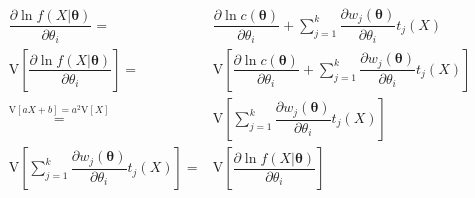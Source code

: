 \documentclass[
]{book}
\theoremstyle{definition}
\theoremstyle{definition}
\theoremstyle{definition}
\theoremstyle{definition}
\theoremstyle{remark}
\begin{document}
\[
\begin{aligned}
\dfrac{\partial\ln f\left(X|\boldsymbol{\theta}\right)}{\partial\theta_{{\scriptscriptstyle i}}}= & \dfrac{\partial\ln c\left(\boldsymbol{\theta}\right)}{\partial\theta_{{\scriptscriptstyle i}}}+\sum\limits _{j=1}^{k}\dfrac{\partial w_{{\scriptscriptstyle j}}\left(\boldsymbol{\theta}\right)}{\partial\theta_{{\scriptscriptstyle i}}}t_{{\scriptscriptstyle j}}\left(X\right)\\
\mathrm{V}\left[\dfrac{\partial\ln f\left(X|\boldsymbol{\theta}\right)}{\partial\theta_{{\scriptscriptstyle i}}}\right]= & \mathrm{V}\left[\dfrac{\partial\ln c\left(\boldsymbol{\theta}\right)}{\partial\theta_{{\scriptscriptstyle i}}}+\sum\limits _{j=1}^{k}\dfrac{\partial w_{{\scriptscriptstyle j}}\left(\boldsymbol{\theta}\right)}{\partial\theta_{{\scriptscriptstyle i}}}t_{{\scriptscriptstyle j}}\left(X\right)\right]\\
\overset{\mathrm{V}\left[aX+b\right]=a^{2}\mathrm{V}\left[X\right]}{=} & \mathrm{V}\left[\sum\limits _{j=1}^{k}\dfrac{\partial w_{{\scriptscriptstyle j}}\left(\boldsymbol{\theta}\right)}{\partial\theta_{{\scriptscriptstyle i}}}t_{{\scriptscriptstyle j}}\left(X\right)\right]\\
\mathrm{V}\left[\sum\limits _{j=1}^{k}\dfrac{\partial w_{{\scriptscriptstyle j}}\left(\boldsymbol{\theta}\right)}{\partial\theta_{{\scriptscriptstyle i}}}t_{{\scriptscriptstyle j}}\left(X\right)\right]= & \mathrm{V}\left[\dfrac{\partial\ln f\left(X|\boldsymbol{\theta}\right)}{\partial\theta_{{\scriptscriptstyle i}}}\right]
\end{aligned}
\]
\end{document}
